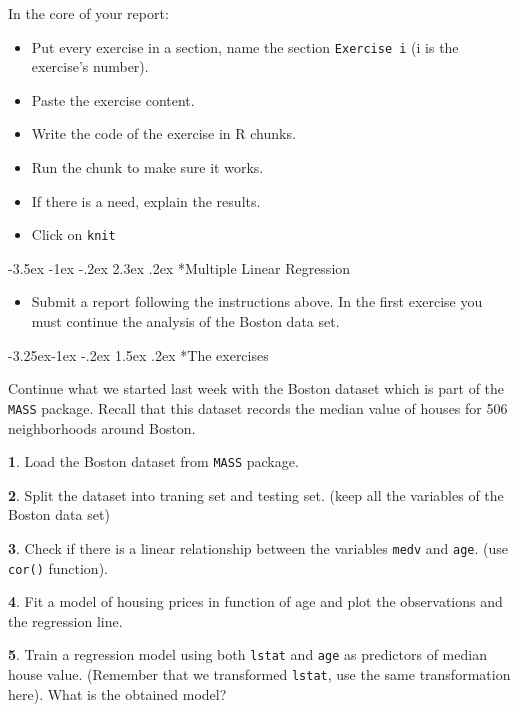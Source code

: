 \documentclass[]{book}
\makeatletter
\providecommand{\tightlist}{%
  \setlength{\itemsep}{0pt}\setlength{\parskip}{0pt}}
\newenvironment{rmdblock}[1]
  {\begin{shaded*}
  \begin{itemize}
  \renewcommand{\labelitemi}{
    \raisebox{-.7\height}[0pt][0pt]{
      {\setkeys{Gin}{width=2em,keepaspectratio}\texttt{[image: img/icons/\#1]}}
    }
  }
  \item
  }
  {
  \end{itemize}
  \end{shaded*}
  }
\newenvironment{rmdexercise}
  {\begin{rmdblock}{exercise}}
  {\end{rmdblock}}
\renewcommand\section{\@startsection {section}{1}{\z@}%
                                   {-3.5ex \@plus -1ex \@minus -.2ex}%
                                   {2.3ex \@plus.2ex}%
                                   {\normalfont\Large\bfseries\color{ForestGreen}}}
\renewcommand\subsection{\@startsection{subsection}{2}{\z@}%
                                     {-3.25ex\@plus -1ex \@minus -.2ex}%
                                     {1.5ex \@plus .2ex}%
                                     {\normalfont\large\bfseries\color{Violet}}}
\theoremstyle{definition}
\theoremstyle{definition}
\theoremstyle{definition}
\theoremstyle{remark}
\makeatother
\begin{document}
In the core of your report:

\begin{itemize}
\tightlist
\item
  Put every exercise in a section, name the section \texttt{Exercise\ i}
  (i is the exercise's number).
\item
  Paste the exercise content.
\item
  Write the code of the exercise in R chunks.
\item
  Run the chunk to make sure it works.
\item
  If there is a need, explain the results.
\item
  Click on \texttt{knit}
\end{itemize}

\section*{Multiple Linear
Regression}\label{multiple-linear-regression-1}

\begin{rmdexercise}
Submit a report following the instructions above. In the first exercise
you must continue the analysis of the Boston data set.
\end{rmdexercise}

\subsection*{The exercises}\label{the-exercises}

Continue what we started last week with the Boston dataset which is part
of the \texttt{MASS} package. Recall that this dataset records the
median value of houses for 506 neighborhoods around Boston.

\textbf{1}. Load the Boston dataset from \texttt{MASS} package.

\textbf{2}. Split the dataset into traning set and testing set. (keep
all the variables of the Boston data set)

\textbf{3}. Check if there is a linear relationship between the
variables \texttt{medv} and \texttt{age}. (use \texttt{cor()} function).

\textbf{4}. Fit a model of housing prices in function of age and plot
the observations and the regression line.

\textbf{5}. Train a regression model using both \texttt{lstat} and
\texttt{age} as predictors of median house value. (Remember that we
transformed \texttt{lstat}, use the same transformation here). What is
the obtained model?
\end{document}
